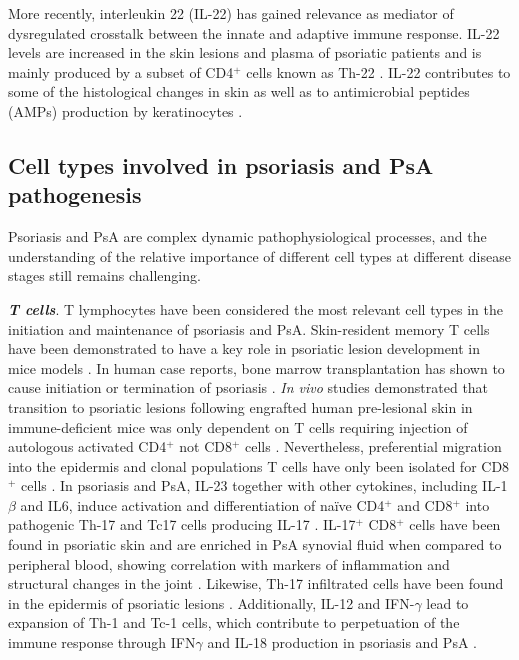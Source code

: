 More recently, interleukin 22 (IL-22) has gained relevance as mediator of dysregulated crosstalk between the innate and adaptive immune response. IL-22 levels are increased in the skin lesions and plasma of psoriatic patients and is mainly produced by a subset of CD4$^+$ cells known as Th-22 \parencite{Wolk2006}. IL-22 contributes to some of the histological changes in skin as well as to antimicrobial peptides (AMPs) production by keratinocytes \parencite{Eyerich2009}.



\subsection{Cell types involved in psoriasis and PsA pathogenesis}

Psoriasis and PsA are complex dynamic pathophysiological processes, and the understanding of the relative importance of different cell types at different disease stages still remains challenging.

\textbf{\textit{T cells}}. T lymphocytes have been considered the most relevant cell types in the initiation and maintenance of psoriasis and PsA.  Skin-resident memory T cells have been demonstrated to have a key role in psoriatic lesion development in mice models \parencite{Boyman2004}. In human case reports, bone marrow transplantation has shown to cause initiation or termination of psoriasis \parencite{Gardembas1990, Eedy1990}. \textit{In vivo} studies demonstrated that transition to psoriatic lesions following engrafted human pre-lesional skin in immune-deficient mice was only dependent on T cells requiring injection of autologous activated CD4$^+$ not CD8$^+$ cells \parencite{Wrone-Smith1996}. Nevertheless, preferential migration into the epidermis and clonal populations T cells have only been isolated for CD8$^+$  cells \parencite{Wrone-Smith1996, Chang1994}. %
In psoriasis and PsA, IL-23 together with other cytokines, including IL-1$\beta$ and IL6, induce activation and differentiation of na\"{i}ve CD4$^+$ and CD8$^+$ into pathogenic Th-17 and Tc17 cells producing IL-17 \parencite{Weaver2007}. IL-17$^+$ CD8$^+$ cells have been found in psoriatic skin and are enriched in PsA synovial fluid when compared to peripheral blood, showing correlation with markers of inflammation and structural changes in the joint \parencite{Menon2014,Ortega2009}. Likewise, Th-17 infiltrated cells have been found in the epidermis of psoriatic lesions \parencite{Lowes2008, Pene2008}. Additionally, IL-12 and IFN-$\gamma$ lead to expansion of Th-1 and Tc-1 cells, which contribute to perpetuation of the immune response through IFN$\gamma$ and IL-18 production in psoriasis and PsA \parencite{Austin1999, Perera2012}.

